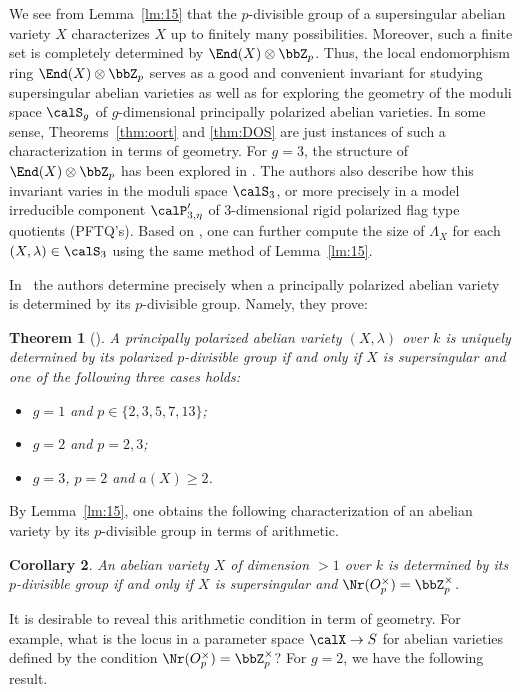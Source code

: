 \documentclass[]{amsart}
\theoremstyle{plain}
\newtheorem{thm}{Theorem}
\newtheorem{cor}[thm]{Corollary}
\theoremstyle{definition}
\theoremstyle{remark}
\def\Zp{{\bbZ}_p}
\newcommand{\<}{\langle}   %
\renewcommand{\>}{\rangle} %
\begin{document}
We see from Lemma~\ref{lm:15} that the $p$-divisible group of a supersingular abelian variety $X$ characterizes $X$ up to finitely many possibilities. Moreover, such a finite set is completely determined by $\End(X)\otimes \Zp$. Thus, the local endomorphism ring $\End(X)\otimes \Zp$ serves  as a good and convenient invariant for studying supersingular abelian varieties as well as for exploring the geometry of the moduli space $\calS_g$ of $g$-dimensional principally polarized abelian varieties. 
In some sense, Theorems~\ref{thm:oort} and \ref{thm:DOS} are just instances of such a characterization in terms of geometry.  
For $g=3$, the structure of $\End(X)\otimes \Zp$ has been explored in \cite{KYY}. The authors also describe how this invariant varies in the moduli space $\calS_3$, or more precisely in a model irreducible component $\calP'_{3,\eta}$ of $3$-dimensional rigid polarized flag type quotients (PFTQ's). %
Based on \cite{KYY}, one can further compute the size of $\Lambda_X$ for each $(X,\lambda)\in \calS_3$ using the same method of Lemma~\ref{lm:15}. 

In~\cite{IKY} the authors determine precisely when a principally polarized abelian variety is determined by its $p$-divisible group. Namely, they prove:
\begin{thm}[{\cite[Corollary B]{IKY}}]\label{thm:IKY}
   A principally polarized abelian variety $(X,\lambda)$ over $k$ is uniquely determined by its polarized $p$-divisible group if and only if $X$ is supersingular and one of the following three cases holds:
\begin{itemize}
\item [(i)] $g=1$ and $p\in \{2,3,5,7,13\}$;
\item [(ii)] $g=2$ and $p=2,3$; 
\item [(iii)] $g=3$, $p=2$ and $a(X)\ge 2$. 
\end{itemize}      
\end{thm}

By Lemma~\ref{lm:15}, one obtains the following characterization of an abelian variety by its $p$-divisible group in terms of arithmetic.

\begin{cor} An abelian variety $X$ of dimension $>1$ over $k$ is determined by its $p$-divisible group if and only if $X$ is supersingular and $\Nr(O_p^\times)=\Zp^\times$.     
\end{cor}
    
It is desirable to reveal this arithmetic condition in term of geometry. For example, what is the locus in a parameter space $\calX\to S$ for abelian varieties defined by the condition $\Nr(O_p^\times)=\Zp^\times$? For $g=2$, we have the following result.
\end{document}

